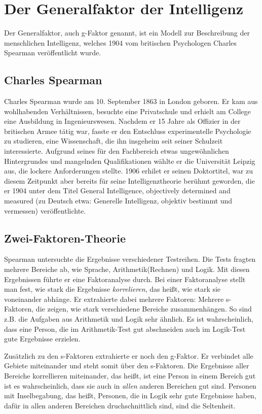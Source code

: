 \chapter{Der Generalfaktor der Intelligenz}

Der Generalfaktor, auch g-Faktor genannt, ist ein Modell zur Beschreibung der
menschlichen Intelligenz, welches 1904 vom britischen Psychologen
Charles Spearman veröffentlicht wurde. \cite{wiki_spearman}

\section{Charles Spearman}
Charles Spearman wurde am 10. September 1863 in London geboren. \cite{wiki_spearman} Er kam aus wohlhabenden Verhältnissen, besuchte eine Privatschule und erhielt am College eine Ausbildung in Ingenieurswesen. Nachdem er 15 Jahre als Offizier in der britischen Armee tätig war, fasste er den Entschluss experimentelle Psychologie zu studieren, eine Wissenschaft, die ihn insgeheim seit seiner Schulzeit interessierte. \cite{galton_spearman} Aufgrund seines für den Fachbereich etwas ungewöhnlichen Hintergrundes und mangelnden Qualifikationen wählte er die Universität Leipzig aus, die lockere Anforderungen stellte. 1906 erhilet er seinen Doktortitel, war zu diesem Zeitpunkt aber bereits für seine Intelligenztheorie berühmt geworden, die er 1904 unter dem Titel \glqq General Intelligence, objectively determined and measured\grqq{} (zu Deutsch etwa: Generelle Intelligenz, objektiv bestimmt und vermessen) veröffentlichte.
\cite{wiki_en_spearman} \cite{york_spearman}

\section{Zwei-Faktoren-Theorie}
Spearman untersuchte die Ergebnisse verschiedener Testreihen. Die Tests fragten mehrere Bereiche ab, wie Sprache, Arithmetik(Rechnen) und Logik. Mit diesen Ergebnissen führte er eine Faktoranalyse durch. Bei einer Faktoranalyse stellt man fest, wie stark die Ergebnisse \emph{korrelieren}, das heißt, wie stark sie voneinander abhänge. Er extrahierte dabei mehrere Faktoren: Mehrere s-Faktoren, die zeigen, wie stark verschiedene Bereiche zusammenhängen. So sind z.B. die Aufgaben aus Arithmetik und Logik sehr ähnlich. Es ist wahrscheinlich, dass eine Person, die im Arithmetik-Test gut abschneiden auch im Logik-Test gute Ergebnisse erzielen.

Zusätzlich zu den s-Faktoren extrahierte er noch den g-Faktor. Er verbindet alle Gebiete miteinander und steht somit über den s-Faktoren. Die Ergebnisse aller Bereiche korrellieren miteinander, das heißt, ist eine Person in einem Bereich gut ist es wahrscheinlich, dass sie auch in \emph{allen} anderen Bereichen gut sind. Personen mit Inselbegabung, das heißt, Personen, die in Logik sehr gute Ergebnisse haben, dafür in allen anderen Bereichen druchschnittlich sind, sind die Seltenheit.

